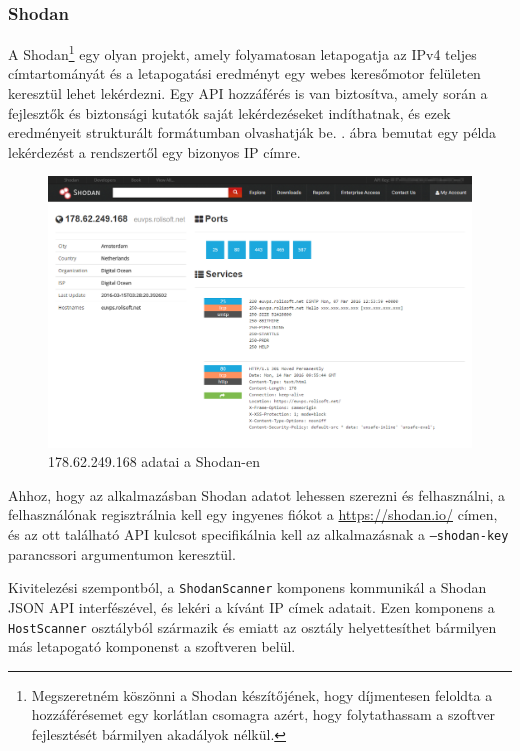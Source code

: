 \documentclass[a4paper,12pt]{article}
\begin{document}
\subsubsection{Shodan} \label{ssec:shodan}

	A Shodan\footnote{Megszeretném köszönni a Shodan készítőjének, hogy díjmentesen feloldta a hozzáférésemet egy korlátlan csomagra azért, hogy folytathassam a szoftver fejlesztését bármilyen akadályok nélkül.}\cite{shodan16} egy olyan projekt, amely folyamatosan letapogatja az IPv4 teljes címtartományát és a letapogatási eredményt egy webes keresőmotor felületen keresztül lehet lekérdezni. Egy API hozzáférés is van biztosítva, amely során a fejlesztők és biztonsági kutatók saját lekérdezéseket indíthatnak, és ezek eredményeit strukturált formátumban olvashatják be. \Az{\ref{shodanscr}}. ábra bemutat egy példa lekérdezést a rendszertől egy bizonyos IP címre.

	\begin{figure}[!htbp]
		\centering
		\includegraphics[scale=0.355]{shodan.png}
		\caption{178.62.249.168 adatai a Shodan-en}
		\label{shodanscr}
	\end{figure}
	
	Ahhoz, hogy az alkalmazásban Shodan adatot lehessen szerezni és felhasználni, a felhasználónak regisztrálnia kell egy ingyenes fiókot a \url{https://shodan.io/} címen, és az ott található API kulcsot specifikálnia kell az alkalmazásnak a \texttt{--shodan-key} parancssori argumentumon keresztül.
	
	Kivitelezési szempontból, a \texttt{ShodanScanner} komponens kommunikál a Shodan JSON API interfészével, és lekéri a kívánt IP címek adatait. Ezen komponens a \texttt{HostScanner} osztályból származik és emiatt az osztály helyettesíthet bármilyen más letapogató komponenst a szoftveren belül.
\end{document}

